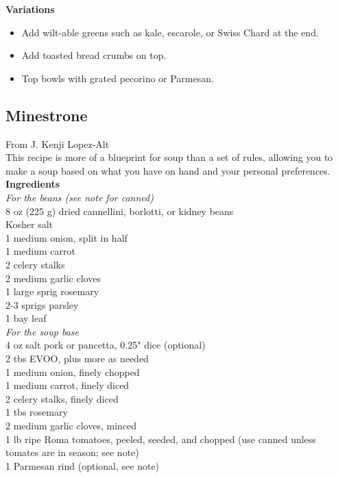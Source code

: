 \documentclass{article}
\numberwithin{figure}{section}
\numberwithin{equation}{section}
\begin{document}
{\bf Variations}
\begin{itemize}
\item Add wilt-able greens such as kale, escarole, or Swiss Chard at the end.
\item Add toasted bread crumbs on top. 
\item Top bowls with grated pecorino or Parmesan.
\end{itemize}

\pagebreak
\subsection{Minestrone}
From J. Kenji Lopez-Alt\\

This recipe is more of a blueprint for soup than a set of rules, allowing you to make a soup based on what you have on hand and your personal preferences.\\

{\bf Ingredients}\\

{\it For the beans (see note for canned)}\\
8 oz (225 g) dried cannellini, borlotti, or kidney beans\\
Kosher salt\\
1 medium onion, split in half\\
1 medium carrot\\
2 celery stalks\\
2 medium garlic cloves\\
1 large sprig rosemary\\
2-3 sprigs parsley\\
1 bay leaf\\

{\it For the soup base}\\
4 oz salt pork or pancetta, 0.25" dice (optional)\\
2 tbs EVOO, plus more as needed\\
1 medium onion, finely chopped\\
1 medium carrot, finely diced\\
2 celery stalks, finely diced\\
1 tbs rosemary\\
2 medium garlic cloves, minced\\
1 lb ripe Roma tomatoes, peeled, seeded, and chopped (use canned unless tomates are in season; see note)\\
1 Parmesan rind (optional, see note)\\
\end{document}

